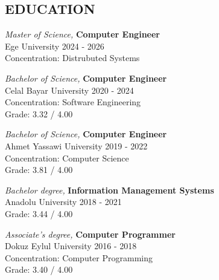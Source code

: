 \documentclass[line,margin]{res}
\begin{document}
\begin{resume}
 
\noindent\hrulefill
\section{EDUCATION}
                {\sl Master of Science,} \textbf{Computer Engineer} \\
                Ege University 
                2024 - 2026 \\
                Concentration: Distrubuted Systems 

                {\sl Bachelor of Science,} \textbf{Computer Engineer} \\
                Celal Bayar University 
                2020 - 2024 \\
                Concentration: Software Engineering \\
                Grade: 3.32 / 4.00 

                {\sl Bachelor of Science,} \textbf{Computer Engineer} \\
                Ahmet Yassawi University 
                2019 - 2022 \\
                Concentration: Computer Science \\
                Grade: 3.81 / 4.00 
 
                {\sl Bachelor degree,} \textbf{Information Management Systems} \\
                Anadolu University 
                2018 - 2021 \\
                Grade: 3.44 / 4.00 

                {\sl Associate's degree,} \textbf{Computer Programmer} \\
                Dokuz Eylul University 
                2016 - 2018 \\
                Concentration: Computer Programming \\
                Grade: 3.40 / 4.00 
 

\end{resume}
\end{document}
